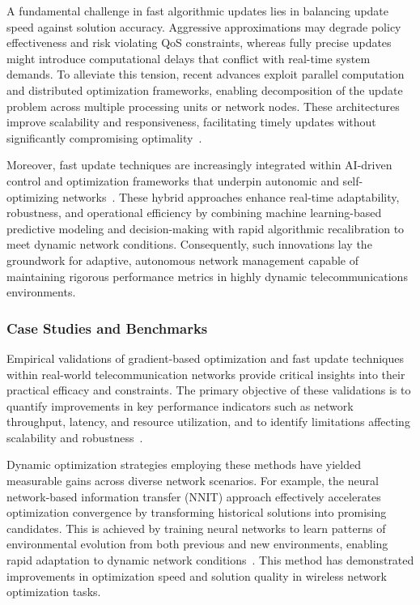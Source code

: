 \documentclass[sigconf]{acmart}
\begin{document}
A fundamental challenge in fast algorithmic updates lies in balancing update speed against solution accuracy. Aggressive approximations may degrade policy effectiveness and risk violating QoS constraints, whereas fully precise updates might introduce computational delays that conflict with real-time system demands. To alleviate this tension, recent advances exploit parallel computation and distributed optimization frameworks, enabling decomposition of the update problem across multiple processing units or network nodes. These architectures improve scalability and responsiveness, facilitating timely updates without significantly compromising optimality~\cite{ref11,ref6}.

Moreover, fast update techniques are increasingly integrated within AI-driven control and optimization frameworks that underpin autonomic and self-optimizing networks~\cite{ref2,ref6,ref11}. These hybrid approaches enhance real-time adaptability, robustness, and operational efficiency by combining machine learning-based predictive modeling and decision-making with rapid algorithmic recalibration to meet dynamic network conditions. Consequently, such innovations lay the groundwork for adaptive, autonomous network management capable of maintaining rigorous performance metrics in highly dynamic telecommunications environments.

\subsubsection{Case Studies and Benchmarks}

Empirical validations of gradient-based optimization and fast update techniques within real-world telecommunication networks provide critical insights into their practical efficacy and constraints. The primary objective of these validations is to quantify improvements in key performance indicators such as network throughput, latency, and resource utilization, and to identify limitations affecting scalability and robustness~\cite{ref1,ref4,ref10,ref37,ref47}. 

Dynamic optimization strategies employing these methods have yielded measurable gains across diverse network scenarios. For example, the neural network-based information transfer (NNIT) approach effectively accelerates optimization convergence by transforming historical solutions into promising candidates. This is achieved by training neural networks to learn patterns of environmental evolution from both previous and new environments, enabling rapid adaptation to dynamic network conditions~\cite{ref47}. This method has demonstrated improvements in optimization speed and solution quality in wireless network optimization tasks.
\end{document}
